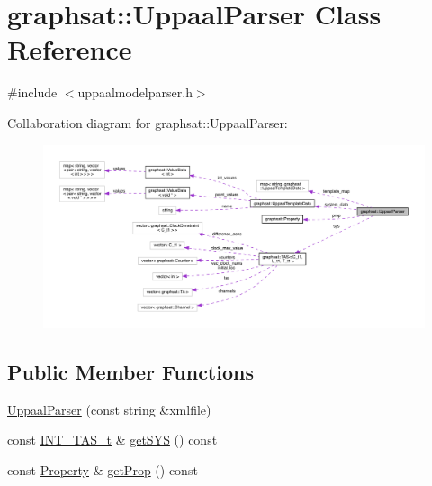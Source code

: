 \hypertarget{classgraphsat_1_1_uppaal_parser}{}\section{graphsat\+::Uppaal\+Parser Class Reference}
\label{classgraphsat_1_1_uppaal_parser}


{\ttfamily \#include $<$uppaalmodelparser.\+h$>$}



Collaboration diagram for graphsat\+::Uppaal\+Parser\+:
\nopagebreak
\begin{figure}[H]
\begin{center}
\leavevmode
\includegraphics[width=350pt]{classgraphsat_1_1_uppaal_parser__coll__graph}
\end{center}
\end{figure}
\subsection*{Public Member Functions}
\begin{DoxyCompactItemize}
\item 
\mbox{\hyperlink{classgraphsat_1_1_uppaal_parser_a39600d3f25a764a60f8e6abd36fc024a}{Uppaal\+Parser}} (const string \&xmlfile)
\item 
const \mbox{\hyperlink{namespacegraphsat_a72468138834e9a7182f32fed8035a2de}{I\+N\+T\+\_\+\+T\+A\+S\+\_\+t}} \& \mbox{\hyperlink{classgraphsat_1_1_uppaal_parser_a30a317e52903660cc1d1715387e3bbe6}{get\+S\+YS}} () const
\item 
const \mbox{\hyperlink{classgraphsat_1_1_property}{Property}} \& \mbox{\hyperlink{classgraphsat_1_1_uppaal_parser_a4f99de4040226d074cabfceaa0d4c109}{get\+Prop}} () const
\end{DoxyCompactItemize}
